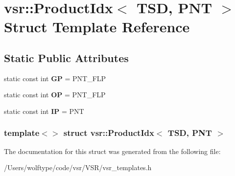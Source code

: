 \hypertarget{structvsr_1_1_product_idx_3_01_t_s_d_00_01_p_n_t_01_4}{\section{vsr\-:\-:Product\-Idx$<$ T\-S\-D, P\-N\-T $>$ Struct Template Reference}
\label{structvsr_1_1_product_idx_3_01_t_s_d_00_01_p_n_t_01_4}
}
\subsection*{Static Public Attributes}
\begin{DoxyCompactItemize}
\item 
\hypertarget{structvsr_1_1_product_idx_3_01_t_s_d_00_01_p_n_t_01_4_a0903ab116cb8f81b8fb52d689b23789d}{static const int {\bfseries G\-P} = P\-N\-T\-\_\-\-F\-L\-P}\label{structvsr_1_1_product_idx_3_01_t_s_d_00_01_p_n_t_01_4_a0903ab116cb8f81b8fb52d689b23789d}

\item 
\hypertarget{structvsr_1_1_product_idx_3_01_t_s_d_00_01_p_n_t_01_4_a2a97deb14e77a899c6ae20190cf0a401}{static const int {\bfseries O\-P} = P\-N\-T\-\_\-\-F\-L\-P}\label{structvsr_1_1_product_idx_3_01_t_s_d_00_01_p_n_t_01_4_a2a97deb14e77a899c6ae20190cf0a401}

\item 
\hypertarget{structvsr_1_1_product_idx_3_01_t_s_d_00_01_p_n_t_01_4_ac1a0c084a444b42bb78589e731c07c55}{static const int {\bfseries I\-P} = P\-N\-T}\label{structvsr_1_1_product_idx_3_01_t_s_d_00_01_p_n_t_01_4_ac1a0c084a444b42bb78589e731c07c55}

\end{DoxyCompactItemize}
\subsubsection*{template$<$$>$ struct vsr\-::\-Product\-Idx$<$ T\-S\-D, P\-N\-T $>$}



The documentation for this struct was generated from the following file\-:\begin{DoxyCompactItemize}
\item 
/\-Users/wolftype/code/vsr/\-V\-S\-R/vsr\-\_\-templates.\-h\end{DoxyCompactItemize}
